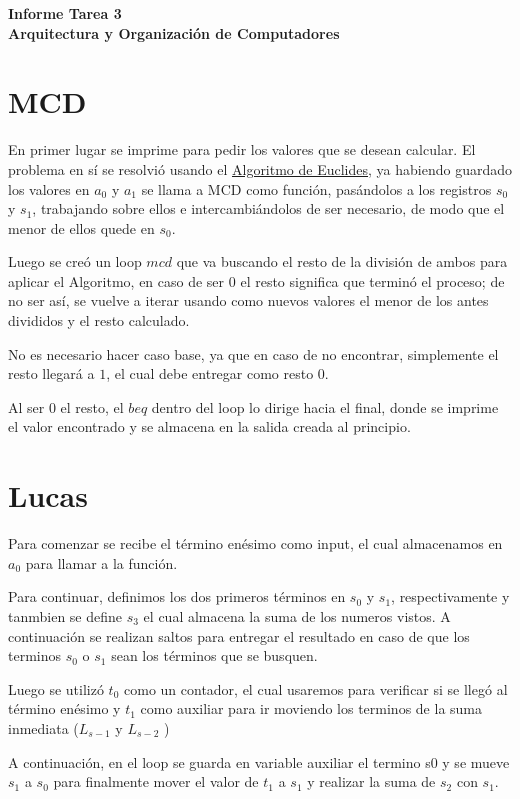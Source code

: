 \documentclass[11pt,letterpaper]{article}
\newcommand{\titulo}{Informe Tarea 3 \\ Arquitectura y Organización de Computadores}
\renewcommand{\maketitle}
{
\thispagestyle{fancy}
\begin{center}
\begin{Large}
\textbf{\titulo}\\
\end{Large}
\end{center}
\vspace{0.3cm}
}
\begin{document}
\setcounter{secnumdepth}{0}
\maketitle
\section{MCD}
En primer lugar se imprime para pedir los valores que se desean calcular. El problema en sí se resolvió usando el \href{https://es.wikipedia.org/wiki/Algoritmo_de_Euclides#Algoritmo_de_Euclides_tradicional}{Algoritmo de Euclides}, ya habiendo guardado los valores en $a_0$ y $a_1$ se llama a MCD como función, pasándolos a los registros $s_0$ y $s_1$, trabajando sobre ellos e intercambiándolos de ser necesario, de modo que el menor de ellos quede en $s_0$. 

Luego se creó un loop $mcd$ que va buscando el resto de la división de ambos para aplicar el Algoritmo, en caso de ser $0$ el resto significa que terminó el proceso; de no ser así, se vuelve a iterar usando como nuevos valores el menor de los antes divididos y el resto calculado.

No es necesario hacer caso base, ya que en caso de no encontrar, simplemente el resto llegará a $1$, el cual debe entregar como resto $0$.

Al ser $0$ el resto, el $beq$ dentro del loop lo dirige hacia el final, donde se imprime el valor encontrado y se almacena en la salida creada al principio. 

\section{Lucas}
Para comenzar se recibe el término enésimo como input, el cual almacenamos en $a_0$ para llamar a la función. 

Para continuar, definimos los dos primeros términos en $s_0$ y $s_1$, respectivamente y tanmbien se define $s_3$ el cual almacena la suma de los numeros vistos. A continuación se realizan saltos para entregar el resultado en caso de que los terminos $s_0$ o $s_1$ sean los términos que se busquen.

Luego se utilizó $t_0$ como un contador, el cual usaremos para verificar si se llegó al término enésimo y $t_1$ como auxiliar para ir moviendo los terminos de la suma inmediata ($L_{s-1}$ y $L_{s-2}$  )

A continuación, en el loop se guarda en variable auxiliar el termino s0 y se mueve  $s_1$ a  $s_0$ para finalmente mover el valor de  $t_1$ a  $s_1$ y realizar la suma de  $s_2$ con  $s_1$.
\end{document}
